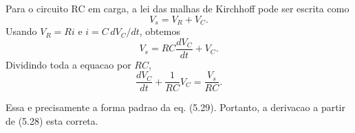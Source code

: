 Para o circuito RC em carga, a lei das malhas de Kirchhoff pode ser escrita como
\[
V_s=V_R+V_C.
\]
Usando $V_R=Ri$ e $i=C\,dV_C/dt$, obtemos
\[
V_s=RC\frac{dV_C}{dt}+V_C.
\]
Dividindo toda a equacao por $RC$,
\[
\frac{dV_C}{dt}+\frac{1}{RC}V_C=\frac{V_s}{RC}.
\]

Essa e precisamente a forma padrao da eq. (5.29). Portanto, a derivacao a partir de (5.28) esta correta.